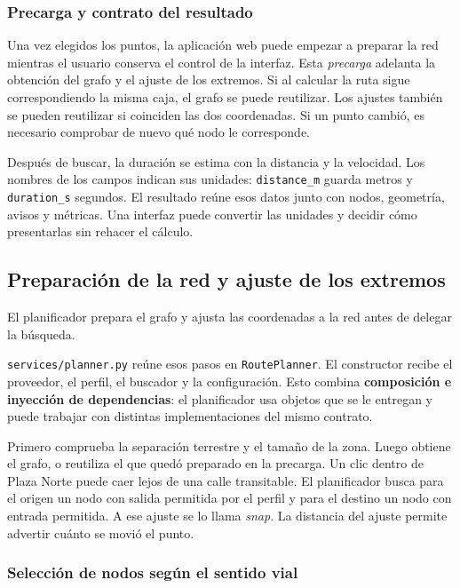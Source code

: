 \documentclass[11pt,a4paper]{article}
\begin{document}
\subsubsection{Precarga y contrato del resultado}
Una vez elegidos los puntos, la aplicación web puede empezar a preparar la red mientras el usuario conserva el control de la interfaz. Esta \emph{precarga} adelanta la obtención del grafo y el ajuste de los extremos. Si al calcular la ruta sigue correspondiendo la misma caja, el grafo se puede reutilizar. Los ajustes también se pueden reutilizar si coinciden las dos coordenadas. Si un punto cambió, es necesario comprobar de nuevo qué nodo le corresponde.

Después de buscar, la duración se estima con la distancia y la velocidad. Los nombres de los campos indican sus unidades: \texttt{distance\_m} guarda metros y \texttt{duration\_s} segundos. El resultado reúne esos datos junto con nodos, geometría, avisos y métricas. Una interfaz puede convertir las unidades y decidir cómo presentarlas sin rehacer el cálculo.

\clearpage

\subsection{Preparación de la red y ajuste de los extremos}

El planificador prepara el grafo y ajusta las coordenadas a la red antes de delegar la búsqueda.

\texttt{services/planner.py} reúne esos pasos en \texttt{RoutePlanner}. El constructor recibe el proveedor, el perfil, el buscador y la configuración. Esto combina \textbf{composición e inyección de dependencias}: el planificador usa objetos que se le entregan y puede trabajar con distintas implementaciones del mismo contrato.

Primero comprueba la separación terrestre y el tamaño de la zona. Luego obtiene el grafo, o reutiliza el que quedó preparado en la precarga. Un clic dentro de Plaza Norte puede caer lejos de una calle transitable. El planificador busca para el origen un nodo con salida permitida por el perfil y para el destino un nodo con entrada permitida. A ese ajuste se lo llama \emph{snap}. La distancia del ajuste permite advertir cuánto se movió el punto.

\subsubsection{Selección de nodos según el sentido vial}
\end{document}
